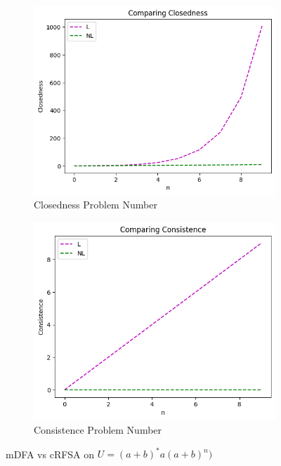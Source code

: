 \begin{figure}[!htb]
\begin{subfigure}[b]{0.3\textwidth}
    \includegraphics[width=\textwidth]{../statistics/plots/wrostDFA/Closedness.png}
    \caption{Closedness Problem Number}
    \label{fig:ClosednessWrostDFACompare}
  \end{subfigure}
  \begin{subfigure}[b]{0.3\textwidth}
    \includegraphics[width=\textwidth]{../statistics/plots/wrostDFA/Consistence.png}
    \caption{Consistence Problem Number}
    \label{fig:ConsistenceWrostDFACompare}
  \end{subfigure}
  \caption{mDFA vs cRFSA on $U = (a+b)^*a(a+b)^n)$}
  \label{fig:wrostDFA}
\end{figure}

